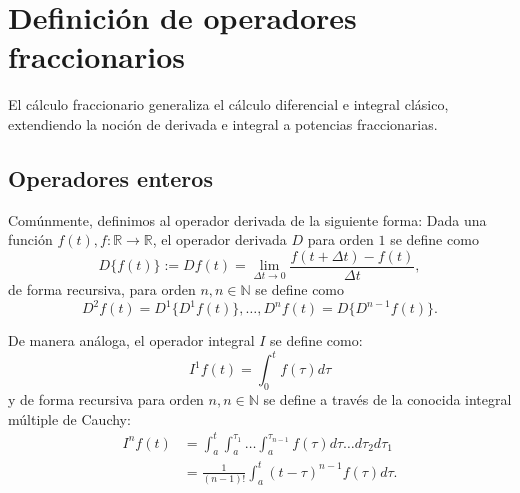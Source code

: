 \documentclass[conference]{IEEEtran}
\begin{document}
\section{Definición de operadores fraccionarios}
El cálculo fraccionario generaliza el cálculo diferencial e integral clásico, extendiendo la noción de derivada e integral a potencias fraccionarias.

\subsection*{Operadores enteros}
Comúnmente, definimos al operador derivada de la siguiente forma:
Dada una función $f(t), f: \mathbb{R} \rightarrow \mathbb{R}$, el operador derivada $D$ para orden $1$ se define como
\begin{equation}
	D\{f(t)\} := Df(t) = \lim_{\Delta t \rightarrow 0} \frac{f(t + \Delta t) - f(t)}{\Delta t},
\end{equation}
de forma recursiva, para orden $n, n \in \mathbb{N}$ se define como
\begin{equation}
	D^2 f(t) = D^{1}\{D^1f(t)\}, \dots , D^n f(t) = D\{D^{n-1}f(t)\}.
\end{equation}

De manera análoga, el operador integral $I$ se define como:
\begin{equation}
	I^1 f(t) = \int_{0}^{t} f(\tau) d\tau
\end{equation}
y de forma recursiva para orden $n, n \in \mathbb{N}$ se define a través de la conocida integral múltiple de Cauchy:
\begin{equation}
	\begin{aligned}
		I^n f(t) & = \int_{a}^{t} \int_{a}^{\tau_1} \dots \int_{a}^{\tau_{n-1}} f(\tau) d\tau \dots d\tau_2 d\tau_1 \\
		         & = \frac{1}{(n-1)!} \int_{a}^{t} (t - \tau)^{n-1} f(\tau) d\tau.
	\end{aligned}
\end{equation}
\end{document}

